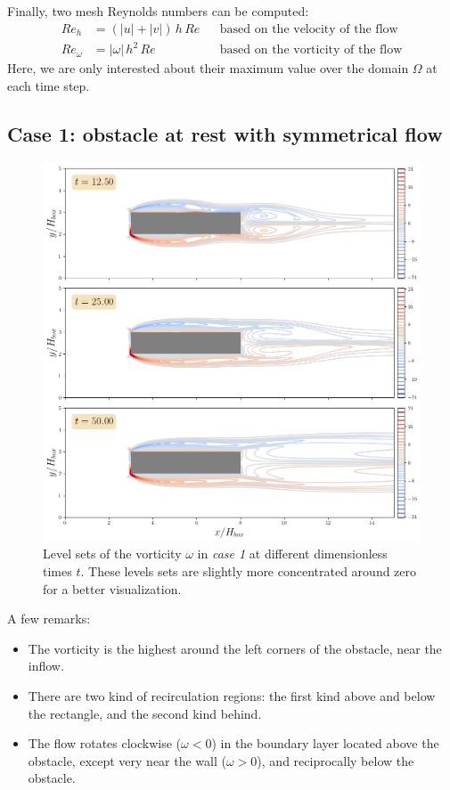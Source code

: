 \documentclass[11 pt]{article}
\begin{document}
Finally, two mesh Reynolds numbers can be computed:
\begin{align}
    Re_h &= (|u|+|v|) \,h \, Re && \text{based on the velocity of the flow}\\
    Re_{\omega} &= |\omega| \,h^2 \, Re && \text{based on the vorticity of the flow}
\end{align}
Here, we are only interested about their maximum value over the domain $\Omega$ at each time step.



\subsection{Case 1: obstacle at rest with symmetrical flow}

\begin{figure}[H]
    \centering
    \includegraphics[width=\textwidth]{../figures/vorticity_case_1.png}
    \caption{Level sets of the vorticity $\omega$ in \textit{case 1} at different dimensionless times $t$. These levels sets are slightly more concentrated around zero for a better visualization.}
    \label{fig:vorticity_1}
\end{figure}

A few remarks:
\begin{itemize}
    \item The vorticity is the highest around the left corners of the obstacle, near the inflow.
    \item There are two kind of recirculation regions: the first kind above and below the rectangle, and the second kind behind.
    \item The flow rotates clockwise ($\omega < 0$) in the boundary layer located above the obstacle, except very near the wall ($\omega > 0$), and reciprocally below the obstacle.
\end{itemize}
\end{document}
